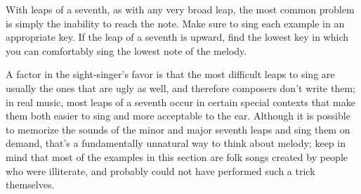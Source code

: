 \documentclass{sight}
\begin{document}
\pagebreak[3]\par
\vspace{5mm}\begin{samepage}
%
\label{tune:304}%
{%
\parindent 0pt
\noindent
\ifx\preLilyPondExample \undefined
\else
  \expandafter\preLilyPondExample
\fi
\def\lilypondbook{}%

\ifx\postLilyPondExample \undefined
\else
  \expandafter\postLilyPondExample
\fi
}
\end{samepage}
\pagebreak[4]


\pagebreak[3]\par
\vspace{5mm}\begin{samepage}With leaps of a seventh, as with any very broad leap, the most common problem is simply the inability to reach the note. Make sure to sing each example in an appropriate key. If the leap of a seventh is upward, find the lowest key in which you can comfortably sing the lowest note of the melody.\\
\end{samepage}


\pagebreak[3]\par
\vspace{5mm}\begin{samepage}A factor in the sight-singer's favor is that the most difficult leaps to sing are usually the ones that are ugly as well, and therefore composers don't write them; in real music, most leaps of a seventh occur in certain special contexts that make them both easier to sing and more acceptable to the ear. Although it is possible to memorize the sounds of the minor and major seventh leaps and sing them on demand, that's a fundamentally unnatural way to think about melody; keep in mind that most of the examples in this section are folk songs created by people who were illiterate, and probably could not have performed such a trick themselves.\\
\end{samepage}
\end{document}
